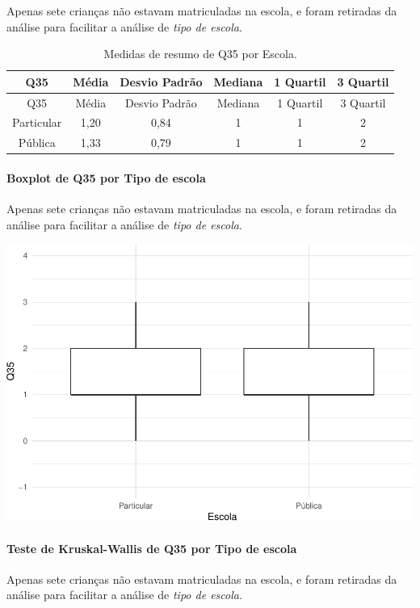 \documentclass[]{article}
\let\oldparagraph\paragraph
\renewcommand{\paragraph}[1]{\oldparagraph{#1}\mbox{}}
\begin{document}
Apenas sete crianças não estavam matriculadas na escola, e foram retiradas da análise para facilitar a análise de \emph{tipo de escola}.

\begin{longtable}[]{@{}cccccc@{}}
\caption{\label{tab:unnamed-chunk-1295}Medidas de resumo de Q35 por Escola.}\tabularnewline
\toprule
Q35 & Média & Desvio Padrão & Mediana & 1 Quartil & 3 Quartil\tabularnewline
\midrule
\endfirsthead
\toprule
Q35 & Média & Desvio Padrão & Mediana & 1 Quartil & 3 Quartil\tabularnewline
\midrule
\endhead
Particular & 1,20 & 0,84 & 1 & 1 & 2\tabularnewline
Pública & 1,33 & 0,79 & 1 & 1 & 2\tabularnewline
\bottomrule
\end{longtable}

\hypertarget{boxplot-de-q35-por-tipo-de-escola}{%
\paragraph{Boxplot de Q35 por Tipo de escola}\label{boxplot-de-q35-por-tipo-de-escola}}

Apenas sete crianças não estavam matriculadas na escola, e foram retiradas da análise para facilitar a análise de \emph{tipo de escola}.

\begin{center}\includegraphics[width=0.75\linewidth]{relatorio_covid19_files/figure-latex/unnamed-chunk-1296-1} \end{center}

\hypertarget{teste-de-kruskal-wallis-de-q35-por-tipo-de-escola}{%
\paragraph{Teste de Kruskal-Wallis de Q35 por Tipo de escola}\label{teste-de-kruskal-wallis-de-q35-por-tipo-de-escola}}

Apenas sete crianças não estavam matriculadas na escola, e foram retiradas da análise para facilitar a análise de \emph{tipo de escola}.
\end{document}
